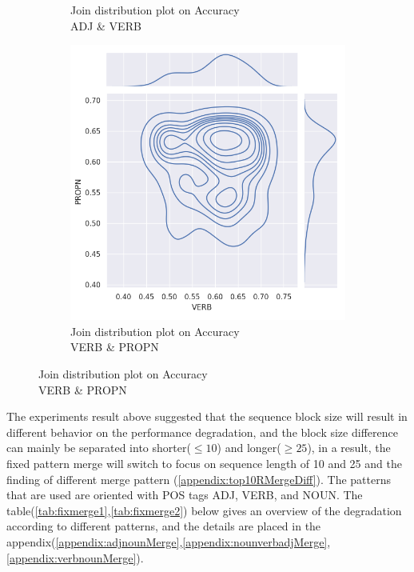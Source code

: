 \documentclass[12pt]{article}
\begin{document}
\begin{figure} [!h]
\begin{subfigure}[h]{0.3\linewidth}
\caption{Join distribution plot on Accuracy\\ADJ \& VERB}
\end{subfigure}
\hfill
\begin{subfigure}[h]{0.3\linewidth}
\includegraphics[width=\linewidth]{figures/merge_verb_propn_joinplot.png}
\caption{Join distribution plot on Accuracy\\VERB \& PROPN}
\label{fig:displot1}
\end{subfigure}
\end{figure}
\newpage
The experiments result above suggested that the sequence block size will result in different behavior on the performance degradation, and the block size difference can mainly be separated into shorter($\leq10$) and longer($\geq25$), in a result, the fixed pattern merge will switch to focus on sequence length of 10 and 25 and the finding of different merge pattern (\ref{appendix:top10RMergeDiff}). The patterns that are used are oriented with POS tags ADJ, VERB, and NOUN. The table(\ref{tab:fixmerge1},\ref{tab:fixmerge2}) below gives an overview of the degradation according to different patterns, and the details are placed in the appendix(\ref{appendix:adjnounMerge},\ref{appendix:nounverbadjMerge},\ref{appendix:verbnounMerge}).
\end{document}
